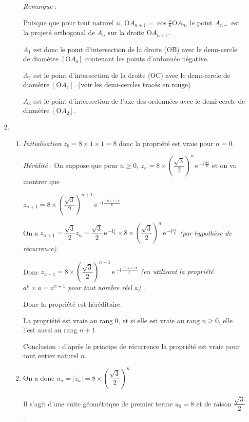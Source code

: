 \documentclass[10pt]{article}
\newcommand{\e}{\mathrm{\,e\,}}%
\begin{document}
\begin{enumerate}
\begin{enumerate}
\smallskip

\emph{Remarque} :

Puisque que pour tout naturel $n$, \: O$A_{n+1} = \cos \frac{\pi}{6} \text{O}A_n$, le point $A_{n+}$ est la projeté orthogonal de $A_n$ sur la droite O$A_{n+1}$.

$A_1$ est donc le point d'intersection de la droite (OB) avec le demi-cercle de diamètre $\left[\text{O}A_0\right]$ contenant les points d'ordonnée négative.

$A_2$ est le point d'intersection de la droite (OC) avec le demi-cercle de diamètre $\left[\text{O}A_1\right]$. (voir les demi-cercles tracés en rouge)

$A_3$ est le point d'intersection de l'axe des ordonnées  avec le demi-cercle de diamètre $\left[\text{O}A_2\right]$.
	\end{enumerate}
	\item 
	\begin{enumerate}
		\item \emph{Initialisation} $z_0 = 8 \times 1 \times 1 = 8$ donc la propriété est vraie pour $n=0$.\smallskip 
		
		\emph{Hérédité} : On suppose que pour $n \geqslant 0$,  $z_n=8 \times \left( \dfrac{\sqrt{3}}{2} \right)^n \e^{-\text{i} \frac{n\pi}{6}}$ et on va montrer que 
		
$z_{n+1} = 8 \times \left( \dfrac{\sqrt{3}}{2} \right)^{n+1} \e^{-\text{i} \frac{(n+1)\pi}{6}}$\medskip 
		
On a $z_{n+1}= \dfrac{\sqrt{3}}{2} z_n= \dfrac{\sqrt{3}}{2}\e^{-\text{i} \frac{\pi}{6}} \times 8\times \left( \dfrac{\sqrt{3}}{2} \right)^n \e^{-\text{i} \frac{n\pi}{6}}$ \textit{(par hypothèse de récurrence)}.\smallskip 
		
Donc $z_{n+1}=8 \times \left( \dfrac{\sqrt{3}}{2} \right)^{n+1} \e^{-\text{i} \frac{(n+1)\pi}{6}}$ \textit{ (en utilisant la propriété $a^n \times a = a^{n+1}$ pour tout nombre réel $a$) }.\smallskip 
		
Donc la propriété est héréditaire.\smallskip 

La propriété est vraie au rang $0$, et si elle est vraie au rang $n \geqslant 0$, elle l'est aussi au rang $n + 1$
		
Conclusion : d'après le principe de récurrence la propriété est vraie pour tout entier naturel $n$.
	\item On a donc $u_n=\left|z_n\right| =8 \times \left( \dfrac{\sqrt{3}}{2} \right)^n$\smallskip 
	
Il s'agit d'une suite géométrique de premier terme $u_0=8$ et de raison $\dfrac{\sqrt{3}}{2}$. \medskip 
	

\end{enumerate}
\end{enumerate}
\end{document}
